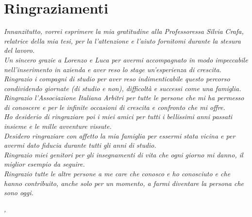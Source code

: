
\cleardoublepage
{}
{}

\bigskip

\begingroup
\let\clearpage\relax
\let\cleardoublepage\relax
\let\cleardoublepage\relax

\chapter*{Ringraziamenti}

\noindent \textit{Innanzitutto, vorrei esprimere la mia gratitudine alla Professoressa Silvia Crafa, relatrice della mia tesi, per la l'attenzione e l'aiuto fornitomi durante la stesura del lavoro.}\\


\noindent \textit{Un sincero grazie a Lorenzo e Luca per avermi accompagnato in modo impeccabile nell'inserimento in azienda e aver reso lo stage un'esperienza di crescita.}\\

\noindent \textit{Ringrazio i compagni di studio per aver reso indimenticabile questo percorso condividendo giornate (di studio e non), difficoltà e successi come una famiglia.}\\

\noindent \textit{Ringrazio l'Associazione Italiana Arbitri per tutte le persone che mi ha permesso di conoscere e per le infinite occasioni di crescita e confronto che mi offre.}\\

\noindent \textit{Ho desiderio di ringraziare poi i miei amici per tutti i bellissimi anni passati insieme e le mille avventure vissute.}\\

\noindent \textit{Desidero ringraziare con affetto la mia famiglia per essermi stata vicina e per avermi dato fiducia durante tutti gli anni di studio.}\\

\noindent \textit{Ringrazio miei genitori per gli insegnamenti di vita che ogni giorno mi danno, il miglior esempio da seguire.}\\

\noindent \textit{Ringrazio tutte le altre persone a me care che conosco e ho conosciuto e che hanno contribuito, anche solo per un momento, a farmi diventare la persona che sono oggi.}\\
\bigskip

\noindent\textit{\myLocation, \myTime}
\hfill \myName

\endgroup

